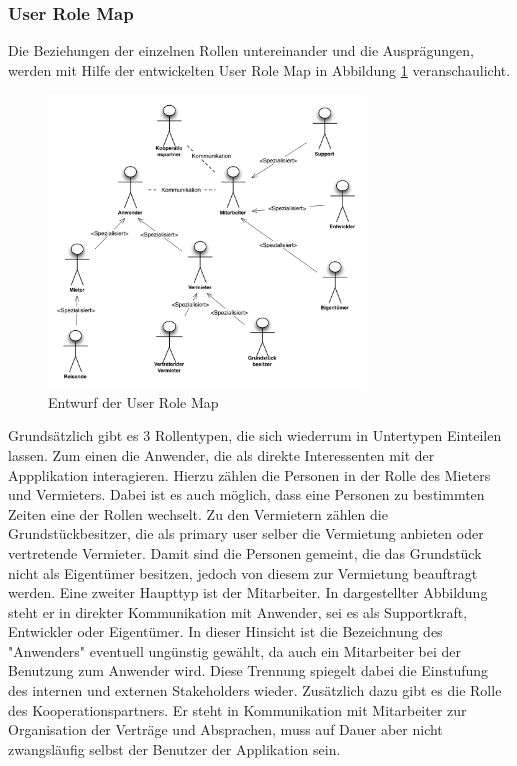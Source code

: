 \subsubsection{User Role Map}
Die Beziehungen der einzelnen Rollen untereinander und die Ausprägungen, werden mit Hilfe der entwickelten User Role Map in Abbildung \ref{fig:rolemap} veranschaulicht.
\begin{figure}[H]
\includegraphics[width=0.75\textwidth]{./images/rolemodeling.png}
\caption{Entwurf der User Role Map}
\label{fig:rolemap}
\end{figure}

Grundsätzlich gibt es 3 Rollentypen, die sich wiederrum in Untertypen Einteilen lassen. Zum einen die Anwender, die als direkte Interessenten mit der Appplikation interagieren. Hierzu zählen die Personen in der Rolle des Mieters und Vermieters. Dabei ist es auch möglich, dass eine Personen zu bestimmten Zeiten eine der Rollen wechselt. Zu den Vermietern zählen die Grundstückbesitzer, die als primary user selber die Vermietung anbieten oder vertretende Vermieter. Damit sind die Personen gemeint, die das Grundstück nicht als Eigentümer besitzen, jedoch von diesem zur Vermietung beauftragt werden.
Eine zweiter Haupttyp ist der Mitarbeiter. In dargestellter Abbildung steht er in direkter Kommunikation mit Anwender, sei es als Supportkraft, Entwickler oder Eigentümer. In dieser Hinsicht ist die Bezeichnung des "Anwenders" eventuell ungünstig gewählt, da auch ein Mitarbeiter bei der Benutzung zum Anwender wird. Diese Trennung spiegelt dabei die Einstufung des internen und externen Stakeholders wieder. Zusätzlich dazu gibt es die Rolle des Kooperationspartners. Er steht in Kommunikation mit Mitarbeiter zur Organisation der Verträge und Absprachen, muss auf Dauer aber nicht zwangsläufig selbst der Benutzer der Applikation sein.




